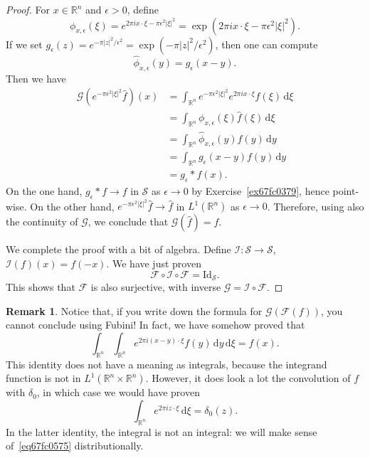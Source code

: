 \documentclass[a4paper,9pt]{amsart}
\newcommand{\scr}[1]{\mathscr{#1}}
\newcommand{\cal}[1]{\mathcal{#1}}
\newcommand{\R}{\mathbb{R}}	%
\newcommand{\Id}{\mathrm{Id}}	%
\newcommand{\did}{\,\mathrm{d}}	%
\theoremstyle{plain}
\theoremstyle{definition}
\newtheorem{remark}[proposition]{Remark}
\theoremstyle{remark}
\begin{document}
\begin{proof}
	For $x\in\R^n$ and $\epsilon>0$, define
	\begin{equation}
		\phi_{x,\epsilon}(\xi) = e^{2\pi i x\cdot\xi - \pi \epsilon^2|\xi|^2}
		= \exp( 2\pi i x\cdot\xi - \pi \epsilon^2|\xi|^2 ).
	\end{equation}
	If we set $g_\epsilon(z) = e^{-\pi|z|^2/\epsilon^2} = \exp(-\pi|z|^2/\epsilon^2)$, 
	then one can compute
	\begin{equation}
		\hat\phi_{x,\epsilon}(y) = g_\epsilon(x-y) .
	\end{equation}
	Then we have
	\begin{align}
		\scr G(e^{ - \pi \epsilon^2|\xi|^2} \hat f )(x) 
		&= \int_{\R^n} e^{ - \pi \epsilon^2|\xi|^2} e^{2\pi i x\cdot\xi}  \hat f(\xi)\did \xi \\
		&= \int_{\R^n} \phi_{x,\epsilon}(\xi) \hat f(\xi) \did \xi \\
		&= \int_{\R^n} \hat \phi_{x,\epsilon}(y) f(y) \did y \\
		&= \int_{\R^n} g_\epsilon(x-y)  f(y) \did y \\
		&= g_\epsilon * f(x) .
	\end{align}
	On the one hand, $g_\epsilon * f\to f$ in $\scr S$ as $\epsilon\to0$ by Exercise~\ref{ex67fc0379}, hence point-wise.
	On the other hand, $e^{ - \pi \epsilon^2|\xi|^2} \hat f\to \hat f$ in $L^1(\R^n)$ as $\epsilon\to0$.
	Therefore, using also the continuity of $\scr G$, we conclude that $\scr G(\hat f) = f$.	
	
	We complete the proof with a bit of algebra.
	Define $\cal I:\scr S\to\scr S$, $\scr I(f)(x) = f(-x)$.
	We have just proven
	\begin{equation}
		\scr F\circ\cal I \circ \scr F = \Id_{\scr S} .
	\end{equation}
	This shows that $\scr F$ is also surjective, with inverse $\scr G=\cal I\circ\scr F$.
\end{proof}

\begin{remark}
	Notice that, if you write down the formula for $\scr G(\scr F(f))$, you cannot conclude using Fubini!
	In fact, we have somehow proved that
	\begin{equation}
		\int_{\R^n} \int_{\R^n} e^{2\pi i (x-y)\cdot\xi} f(y) \did y\did \xi = f(x) .
	\end{equation}
	This identity does not have a meaning as integrals, because the integrand function is not in $L^1(\R^n\times\R^n)$.
	However, it does look a lot the convolution of $f$ with $\delta_0$, in which case we would have proven
	\begin{equation}\label{eq67fc0575}
		\int_{\R^n} e^{2\pi i z\cdot\xi} \did \xi = \delta_0(z) .
	\end{equation}
	In the latter identity, the integral is not an integral:
	we will make sense of~\eqref{eq67fc0575} distributionally.
\end{remark}
\end{document}
